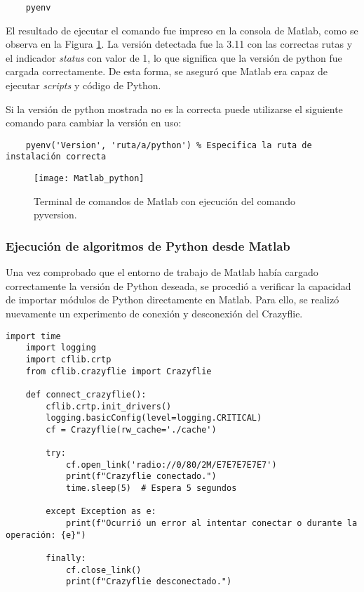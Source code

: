 \begin{verbatim}
	pyenv
\end{verbatim}

El resultado de ejecutar el comando fue impreso en la consola de Matlab, como se observa en la Figura \ref{fig:Matlab_python}. La versión detectada fue la 3.11 con las correctas rutas y el indicador \textit{status} con valor de 1, lo que significa que la versión de python fue cargada correctamente. De esta forma, se aseguró que Matlab era capaz de ejecutar \textit{scripts} y código de Python.

Si la versión de python mostrada no es la correcta puede utilizarse el siguiente comando para cambiar la versión en uso: 

\begin{verbatim}
	pyenv('Version', 'ruta/a/python') % Especifica la ruta de instalación correcta
\end{verbatim}

\begin{figure}[htbp]
	\centering
	\texttt{[image: Matlab\_python]}
	\caption{Terminal de comandos de Matlab con ejecución del comando pyversion.}
	\label{fig:Matlab_python}
\end{figure} 

\newpage
\subsubsection{Ejecución de algoritmos de Python desde Matlab}
Una vez comprobado que el entorno de trabajo de Matlab había cargado correctamente la versión de Python deseada, se procedió a verificar la capacidad de importar módulos de Python directamente en Matlab. Para ello, se realizó nuevamente un experimento de conexión y desconexión del Crazyflie. 

\vspace{5mm}
\begin{lstlisting}[caption=Algoritmo de prueba de conexión con Crazyflie., label=code:matlab_prueba1]
	import time
	import logging
	import cflib.crtp
	from cflib.crazyflie import Crazyflie
	
	def connect_crazyflie():
		cflib.crtp.init_drivers()
		logging.basicConfig(level=logging.CRITICAL)
		cf = Crazyflie(rw_cache='./cache')
		
		try:
			cf.open_link('radio://0/80/2M/E7E7E7E7E7')
			print(f"Crazyflie conectado.")
			time.sleep(5)  # Espera 5 segundos
			
		except Exception as e:
			print(f"Ocurrió un error al intentar conectar o durante la operación: {e}")
		
		finally:
			cf.close_link()
			print(f"Crazyflie desconectado.")

\end{lstlisting}


